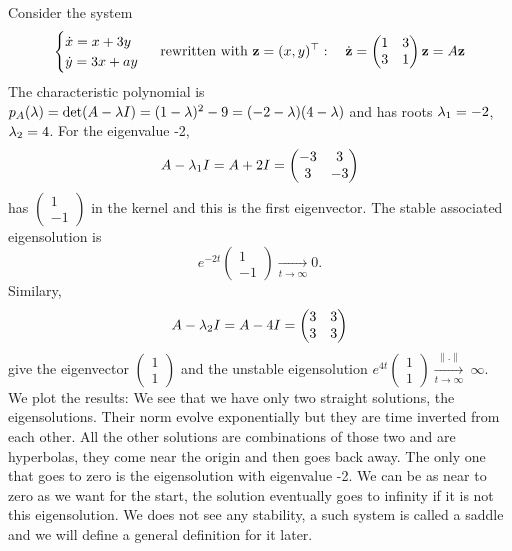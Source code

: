 \begin{exemple}[saddle]
Consider the system
$$\begin{cases}
    \dot{x}=x+3y \\
    \dot{y}=3x+ay
\end{cases}
\text{ rewritten with } \mathbf{z}=(x,y)^\top: \quad \dot{\mathbf{z}}=
\begin{pmatrix} 1&3\\3&1 \end{pmatrix}\mathbf{z} =A\mathbf{z}
$$
The characteristic polynomial is $p_A(\lambda)=\det(A-\lambda I)=(1-\lambda)^2-9=(-2-\lambda)(4-\lambda)$ and has roots $\lambda_1=-2$, $\lambda_2=4$. For the eigenvalue -2, $$ A-\lambda_1I = A+2I= \begin{pmatrix} -3&3\\3&-3 \end{pmatrix} $$
has $\begin{pmatrix}1\\-1\end{pmatrix}$ in the kernel and this is the first eigenvector. The stable associated eigensolution is $$e^{-2t}\begin{pmatrix}1\\-1\end{pmatrix} \xrightarrow[t\to\infty]{} 0.$$
Similary, 
$$ A-\lambda_2I = A-4I= \begin{pmatrix} 3&3\\3&3 \end{pmatrix} $$
give the eigenvector $\begin{pmatrix}1\\1\end{pmatrix}$ and the unstable eigensolution $e^{4t}\begin{pmatrix}1\\1\end{pmatrix}\xrightarrow[t\to\infty]{\|.\|}~\infty$. We plot the results: 
We see that we have only two straight solutions, the eigensolutions. Their norm evolve exponentially but they are time inverted from each other. All the other solutions are combinations of those two and are hyperbolas, they come near the origin and then goes back away. The only one that goes to zero is the eigensolution with eigenvalue -2. We can be as near to zero as we want for the start, the solution eventually goes to infinity if it is not this eigensolution. We does not see any stability, a such system is called a saddle and we will define a general definition for it later.
\end{exemple}

